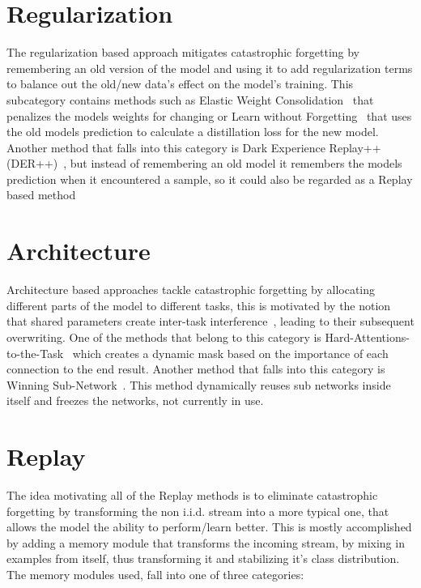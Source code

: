 \documentclass[oneside]{ctuthesis}
\begin{document}
\section{Regularization}
The regularization based approach mitigates catastrophic forgetting by remembering an old version of the model and using it to add regularization terms to balance out the old/new data's effect on the model's training. This subcategory contains methods such as Elastic Weight Consolidation~\cite{EWC} that penalizes the models weights for changing or Learn without Forgetting~\cite{LwF} that uses the old models prediction to calculate a distillation loss for the new model. Another method that falls into this category is Dark Experience Replay++ (DER++)~\cite{DER}, but instead of remembering an old model it remembers the models prediction when it encountered a sample, so it could also be regarded as a Replay based method

\section{Architecture}
Architecture based approaches tackle catastrophic forgetting by allocating different parts of the model to different tasks, this is motivated by the notion that shared parameters create inter-task interference~\cite{clsurvey}, leading to their subsequent overwriting.
One of the methods that belong to this category is Hard-Attentions-to-the-Task~\cite{HAT} which creates a dynamic mask based on the importance of each connection to the end result. Another method that falls into this category is Winning Sub-Network~\cite{WSN}. This method dynamically reuses sub networks inside itself and freezes the networks, not currently in use.

\section{Replay}
The idea motivating all of the Replay methods is to eliminate catastrophic forgetting by transforming the non i.i.d. stream into a more typical one, that allows the model the ability to perform/learn better. This is mostly accomplished by adding a memory module that transforms the incoming stream, by mixing in examples  from itself, thus transforming it and stabilizing it's class distribution. The memory modules used, fall into one of three categories:
\end{document}
